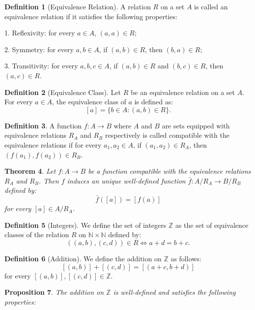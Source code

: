 \documentclass[12pt, reqno]{amsart}
\newtheorem{theorem}{Theorem}[section]
\newtheorem{proposition}[theorem]{Proposition}
\theoremstyle{definition}
\newtheorem{definition}[theorem]{Definition}
\theoremstyle{remark}
\numberwithin{equation}{section}
\begin{document}
{\begin{definition}[Equivalence Relation]
    A relation $R$ on a set $A$ is called an equivalence relation if it satisfies the following properties:

    1. Reflexivity: for every $a\in A$, $(a, a)\in R$;

    2. Symmetry: for every $a, b \in A$, if $(a, b)\in R$, then $(b, a)\in R$;

    3. Transitivity: for every $a, b, c \in A$, if $(a, b)\in R$ and $(b, c)\in R$, then $(a, c)\in R$.
\end{definition}

\begin{definition}[Equivalence Class]
    Let $R$ be an equivalence relation on a set $A$. For every $a\in A$, the equivalence class of $a$ is defined as:
    \[
        [a] = \{b\in A: (a, b)\in R\}.
    \]
\end{definition}

\begin{definition}
    A function $f: A \to B$ where $A$ and $B$ are sets equipped with equivalence relations $R_A$ and $R_B$ respectively is called compatible with the equivalence relations if for every $a_1, a_2 \in A$, if $(a_1, a_2)\in R_A$, then $(f(a_1), f(a_2))\in R_B$.
\end{definition}

\begin{theorem}
    Let $f: A \to B$ be a function compatible with the equivalence relations $R_A$ and $R_B$. Then $f$ induces an unique well-defined function $\bar{f}: A/R_A \to B/R_B$ defined by:
    \[
        \bar{f}([a]) = [f(a)]
    \]
    for every $[a] \in A/R_A$.
\end{theorem}

\begin{definition}[Integers]
    We define the set of integers $\mathbb{Z}$ as the set of equivalence classes of the relation $R$ on $\mathbb{N} \times \mathbb{N}$ defined by:
    \[
        ((a, b), (c, d)) \in R \iff a + d = b + c.
    \]
\end{definition}

\begin{definition}[Addition]
    We define the addition on $\mathbb{Z}$ as follows:
    \[
        [(a, b)] + [(c, d)] = [(a + c, b + d)]
    \]
    for every $[(a, b)], [(c, d)] \in \mathbb{Z}$.
\end{definition}

\begin{proposition}
    The addition on $\mathbb{Z}$ is well-defined and satisfies the following properties:


\end{proposition}}
\end{document}
